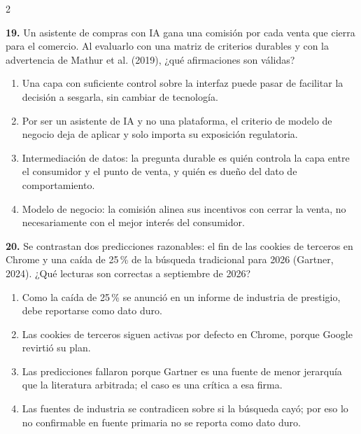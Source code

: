 \documentclass[10pt,letterpaper]{article}
\newcommand{\cas}{\framebox[1.0em]{\rule{0pt}{1.05ex}}}
\begin{document}
\begin{multicols}{2}
\begin{minipage}[t]{\columnwidth}\noindent\textbf{19.} Un asistente de compras con IA gana una comisión por cada venta que cierra para el comercio. Al evaluarlo con una matriz de criterios durables y con la advertencia de Mathur et al. (2019), ¿qué afirmaciones son válidas?
\vspace{1pt}\begin{enumerate}[label=\cas\ \alph*),leftmargin=2.3em,itemsep=1.2pt,topsep=1pt,parsep=0pt,partopsep=0pt]
\item Una capa con suficiente control sobre la interfaz puede pasar de facilitar la decisión a sesgarla, sin cambiar de tecnología.
\item Por ser un asistente de IA y no una plataforma, el criterio de modelo de negocio deja de aplicar y solo importa su exposición regulatoria.
\item Intermediación de datos: la pregunta durable es quién controla la capa entre el consumidor y el punto de venta, y quién es dueño del dato de comportamiento.
\item Modelo de negocio: la comisión alinea sus incentivos con cerrar la venta, no necesariamente con el mejor interés del consumidor.
\end{enumerate}\end{minipage}\par\vspace{3pt}
\begin{minipage}[t]{\columnwidth}\noindent\textbf{20.} Se contrastan dos predicciones razonables: el fin de las cookies de terceros en Chrome y una caída de 25\,\% de la búsqueda tradicional para 2026 (Gartner, 2024). ¿Qué lecturas son correctas a septiembre de 2026?
\vspace{1pt}\begin{enumerate}[label=\cas\ \alph*),leftmargin=2.3em,itemsep=1.2pt,topsep=1pt,parsep=0pt,partopsep=0pt]
\item Como la caída de 25\,\% se anunció en un informe de industria de prestigio, debe reportarse como dato duro.
\item Las cookies de terceros siguen activas por defecto en Chrome, porque Google revirtió su plan.
\item Las predicciones fallaron porque Gartner es una fuente de menor jerarquía que la literatura arbitrada; el caso es una crítica a esa firma.
\item Las fuentes de industria se contradicen sobre si la búsqueda cayó; por eso lo no confirmable en fuente primaria no se reporta como dato duro.

\end{enumerate}
\end{minipage}
\end{multicols}
\end{document}
